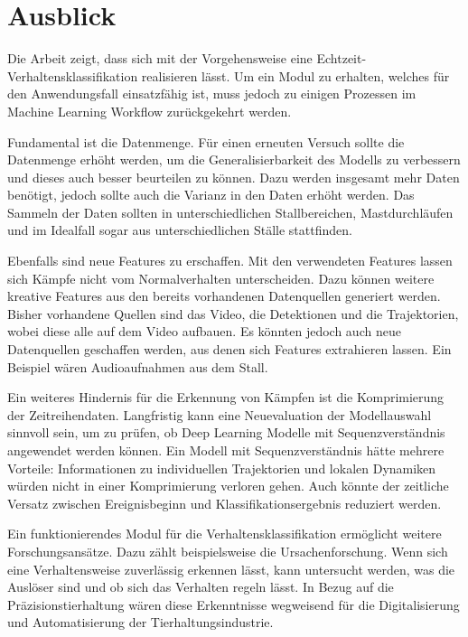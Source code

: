 \section{Ausblick} \label{sec:Ausblick}

Die Arbeit zeigt, dass sich mit der Vorgehensweise eine Echtzeit-Verhaltensklassifikation realisieren lässt. Um ein Modul zu erhalten, welches für den Anwendungsfall einsatzfähig ist, muss jedoch zu einigen Prozessen im Machine Learning Workflow zurückgekehrt werden. \par

Fundamental ist die Datenmenge. Für einen erneuten Versuch sollte die Datenmenge erhöht werden, um die Generalisierbarkeit des Modells zu verbessern und dieses auch besser beurteilen zu können. Dazu werden insgesamt mehr Daten benötigt, jedoch sollte auch die Varianz in den Daten erhöht werden. Das Sammeln der Daten sollten in unterschiedlichen Stallbereichen, Mastdurchläufen und im Idealfall sogar aus unterschiedlichen Ställe stattfinden. \par

Ebenfalls sind neue Features zu erschaffen. Mit den verwendeten Features lassen sich Kämpfe nicht vom Normalverhalten unterscheiden. Dazu können weitere kreative Features aus den bereits vorhandenen Datenquellen generiert werden. Bisher vorhandene Quellen sind das Video, die Detektionen und die Trajektorien, wobei diese alle auf dem Video aufbauen. Es könnten jedoch auch neue Datenquellen geschaffen werden, aus denen sich Features extrahieren lassen. Ein Beispiel wären Audioaufnahmen aus dem Stall. \par

Ein weiteres Hindernis für die Erkennung von Kämpfen ist die Komprimierung der Zeitreihendaten. Langfristig kann eine Neuevaluation der Modellauswahl sinnvoll sein, um zu prüfen, ob Deep Learning Modelle mit Sequenzverständnis angewendet werden können. Ein Modell mit Sequenzverständnis hätte mehrere Vorteile: Informationen zu individuellen Trajektorien und lokalen Dynamiken würden nicht in einer Komprimierung verloren gehen. Auch könnte der zeitliche Versatz zwischen Ereignisbeginn und Klassifikationsergebnis reduziert werden. \par

Ein funktionierendes Modul für die Verhaltensklassifikation ermöglicht weitere Forschungsansätze. Dazu zählt beispielsweise die Ursachenforschung. Wenn sich eine Verhaltensweise zuverlässig erkennen lässt, kann untersucht werden, was die Auslöser sind und ob sich das Verhalten regeln lässt. In Bezug auf die Präzisionstierhaltung wären diese Erkenntnisse wegweisend für die Digitalisierung und Automatisierung der Tierhaltungsindustrie.